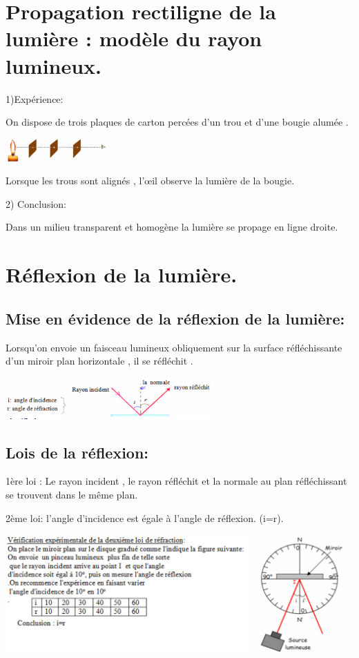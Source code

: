 \documentclass[12pt]{article}
\begin{document}
  \section{Propagation rectiligne de la lumière : modèle du rayon lumineux. }

  1)Expérience:

On dispose de trois plaques de carton percées d'un trou et d'une bougie alumée .
  \begin{center}
    \includegraphics[width=0.3\textwidth]{./img/Optique_00.png}
\end{center}

Lorsque les trous sont alignés , l'œil observe la lumière de la bougie.

  2) Conclusion:

  Dans un milieu transparent et homogène la lumière se propage en ligne droite.
  \section{Réflexion de la lumière.}
  \subsection{Mise en évidence de la réflexion de la lumière:}
Lorsqu'on envoie un faisceau lumineux obliquement sur la surface réfléchissante d'un miroir plan horizontale , il se
réfléchit .
  \begin{center}
    \includegraphics[width=0.6\textwidth]{./img/optique_01.png}
\end{center}

  \subsection{Lois de la réflexion: }
  \begin{tcolorbox}
  1ère loi : Le rayon incident , le rayon réfléchit et la normale au plan réfléchissant se trouvent dans le même plan.

    2ème loi: l'angle d'incidence est égale à l'angle de réflexion. (i=r).
  \end{tcolorbox}
  \begin{center}
    \includegraphics[width=1\textwidth]{./img/Optique_02.png}
\end{center}
\end{document}
